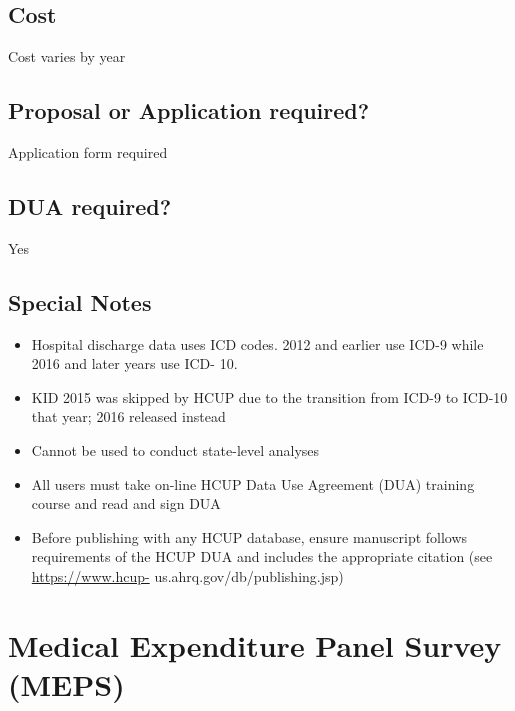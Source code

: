 \documentclass[
]{book}
\providecommand{\tightlist}{%
  \setlength{\itemsep}{0pt}\setlength{\parskip}{0pt}}
\begin{document}
\hypertarget{cost-35}{%
\section{Cost}\label{cost-35}}

Cost varies by year

\hypertarget{proposal-or-application-required-35}{%
\section{Proposal or Application required?}\label{proposal-or-application-required-35}}

Application form required

\hypertarget{dua-required-35}{%
\section{DUA required?}\label{dua-required-35}}

Yes

\hypertarget{special-notes-35}{%
\section{Special Notes}\label{special-notes-35}}

\begin{itemize}
\tightlist
\item
  Hospital discharge data uses ICD codes. 2012 and earlier use ICD-9 while 2016 and later years use ICD- 10.
\item
  KID 2015 was skipped by HCUP due to the transition from ICD-9 to ICD-10 that year; 2016 released instead
\item
  Cannot be used to conduct state-level analyses
\item
  All users must take on-line HCUP Data Use Agreement (DUA) training course and read and sign DUA
\item
  Before publishing with any HCUP database, ensure manuscript follows requirements of the HCUP DUA and includes the appropriate citation (see \url{https://www.hcup-} us.ahrq.gov/db/publishing.jsp)
\end{itemize}

\mainmatter

\hypertarget{medical-expenditure-panel-survey-meps}{%
\chapter{Medical Expenditure Panel Survey (MEPS)}\label{medical-expenditure-panel-survey-meps}}
\end{document}
